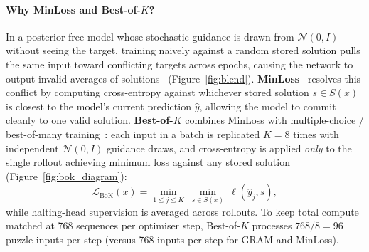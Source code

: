 \documentclass[11pt]{article}
\newcommand{\Bok}{Best-of-$K$}
\begin{document}
\paragraph{Why MinLoss and \Bok{}?}
In a posterior-free model whose stochastic guidance is drawn from $\mathcal{N}(0, I)$ without seeing the target, training naively against a random stored solution pulls the same input toward conflicting targets across epochs, causing the network to output invalid averages of solutions~\cite{nandwani2021} (Figure~\ref{fig:blend}). \textbf{MinLoss}~\cite{nandwani2021} resolves this conflict by computing cross-entropy against whichever stored solution $s \in S(x)$ is closest to the model's current prediction $\hat{y}$, allowing the model to commit cleanly to one valid solution. \textbf{\Bok{}} combines MinLoss with multiple-choice / best-of-many training~\cite{guzman2012,bhattacharyya2018}: each input in a batch is replicated $K=8$ times with independent $\mathcal{N}(0, I)$ guidance draws, and cross-entropy is applied \emph{only} to the single rollout achieving minimum loss against any stored solution (Figure~\ref{fig:bok_diagram}):
\begin{equation}
  \mathcal{L}_{\text{BoK}}(x) = \min_{1 \le j \le K}\ \min_{s \in S(x)}\ \ell(\hat{y}_j, s),
\end{equation}
while halting-head supervision is averaged across rollouts. To keep total compute matched at 768 sequences per optimiser step, \Bok{} processes $768 / 8 = 96$ puzzle inputs per step (versus 768 inputs per step for GRAM and MinLoss).
\end{document}
